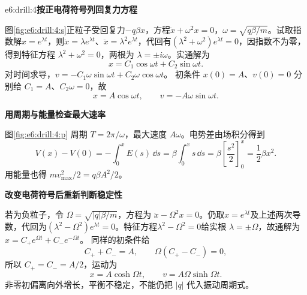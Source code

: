 \begin{drillsolution}{e6:drill:4}\textbf{按正电荷符号列回复力方程}\par\nobreak
图\ref{fig:e6:drill:4:s}正粒子受回复力$-q\beta x$，方程$\ddot x+\omega^2x=0$，$\omega=\sqrt{q\beta/m}$。试取指数解$x=e^{\lambda t}$，则$\dot x=\lambda e^{\lambda t}$、$\ddot x=\lambda^2e^{\lambda t}$，代回有$(\lambda^2+\omega^2)e^{\lambda t}=0$，因指数不为零，得到特征方程
$\lambda^2+\omega^2=0$，两根为 $\lambda=\pm i\omega$。实通解为
\[
x=C_1\cos\omega t+C_2\sin\omega t.
\]
对时间求导，$v=-C_1\omega\sin\omega t+C_2\omega\cos\omega t$。
初条件 $x(0)=A$、$v(0)=0$ 分别给 $C_1=A$、$C_2\omega=0$，故
\[
x=A\cos\omega t,\qquad v=-A\omega\sin\omega t.
\]



\par\medskip{}\noindent\textbf{用周期与能量检查最大速率}\par\nobreak
图\ref{fig:e6:drill:4:p} 周期 $T=2\pi/\omega$，最大速度 $A\omega$。电势差由场积分得到
\[
V(x)-V(0)=-\int_0^x E(s)\,\dd s
=\beta\int_0^x s\,\dd s
=\beta\left[\frac{s^2}{2}\right]_0^x=\frac12\beta x^2.
\]
用能量也得 $mv_{\max}^2/2=q\beta A^2/2$。

\par\medskip{}\noindent\textbf{改变电荷符号后重新判断稳定性}\par\nobreak
若为负粒子，令 $\Omega=\sqrt{|q|\beta/m}$，方程为
$\ddot x-\Omega^2x=0$。仍取$x=e^{\lambda t}$及上述两次导数，代回为$(\lambda^2-\Omega^2)e^{\lambda t}=0$。特征方程$\lambda^2-\Omega^2=0$给实根
$\lambda=\pm\Omega$，故通解为 $x=C_+e^{\Omega t}+C_-e^{-\Omega t}$。
同样的初条件给
\[
C_++C_-=A,\qquad \Omega(C_+-C_-)=0,
\]
所以 $C_+=C_-=A/2$，运动为
\[
x=A\cosh\Omega t,\qquad v=A\Omega\sinh\Omega t.
\]
非零初偏离向外增长，平衡不稳定，不能仍把 $|q|$ 代入振动周期式。\end{drillsolution}
